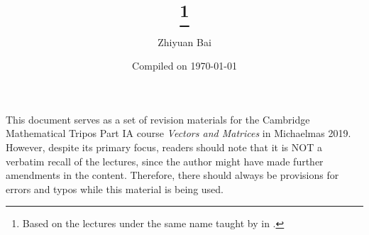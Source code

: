 \documentclass[a4paper]{article}
\title{\triposcourse{}
\thanks{Based on the lectures under the same name taught by \triposlecturer{} in \triposterm{}.}}
\author{Zhiyuan Bai}
\date{Compiled on \today}
\newcommand{\triposcourse}{Vectors and Matrices}
\newcommand{\triposterm}{Michaelmas 2019}
\newcommand{\tripospart}{IA}
\theoremstyle{plain}
\theoremstyle{definition}
\theoremstyle{remark}
\begin{document}
    \maketitle
    This document serves as a set of revision materials for the Cambridge Mathematical Tripos Part \tripospart{} course \textit{\triposcourse{}} in \triposterm{}.
    However, despite its primary focus, readers should note that it is NOT a verbatim recall of the lectures, since the author might have made further amendments in the content.
    Therefore, there should always be provisions for errors and typos while this material is being used.
    \tableofcontents
    
    
    
    
    
    
    
\end{document}
